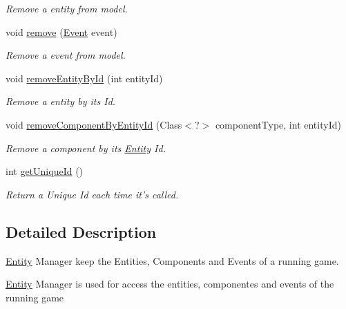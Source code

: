 \begin{DoxyCompactItemize}
\begin{DoxyCompactList}\small\item\em Remove a entity from model. \end{DoxyCompactList}\item 
void \hyperlink{interfacebr_1_1unb_1_1unbomber_1_1core_1_1_entity_manager_a3acaa499cf0c16f455b604f3e67d0212}{remove} (\hyperlink{classbr_1_1unb_1_1unbomber_1_1core_1_1_event}{Event} event)
\begin{DoxyCompactList}\small\item\em Remove a event from model. \end{DoxyCompactList}\item 
void \hyperlink{interfacebr_1_1unb_1_1unbomber_1_1core_1_1_entity_manager_a6ab82df2446c25044f2499c508f65c85}{remove\+Entity\+By\+Id} (int entity\+Id)
\begin{DoxyCompactList}\small\item\em Remove a entity by its Id. \end{DoxyCompactList}\item 
void \hyperlink{interfacebr_1_1unb_1_1unbomber_1_1core_1_1_entity_manager_aebbc4b8d60b0573f2be072e686b88b54}{remove\+Component\+By\+Entity\+Id} (Class$<$?$>$ component\+Type, int entity\+Id)
\begin{DoxyCompactList}\small\item\em Remove a component by its \hyperlink{classbr_1_1unb_1_1unbomber_1_1core_1_1_entity}{Entity} Id. \end{DoxyCompactList}\item 
int \hyperlink{interfacebr_1_1unb_1_1unbomber_1_1core_1_1_entity_manager_ac05d9bff2e227392cb1a5ddf6f3d3327}{get\+Unique\+Id} ()
\begin{DoxyCompactList}\small\item\em Return a Unique Id each time it's called. \end{DoxyCompactList}\end{DoxyCompactItemize}


\subsection{Detailed Description}
\hyperlink{classbr_1_1unb_1_1unbomber_1_1core_1_1_entity}{Entity} Manager keep the Entities, Components and Events of a running game. 

\hyperlink{classbr_1_1unb_1_1unbomber_1_1core_1_1_entity}{Entity} Manager is used for access the entities, componentes and events of the running game

